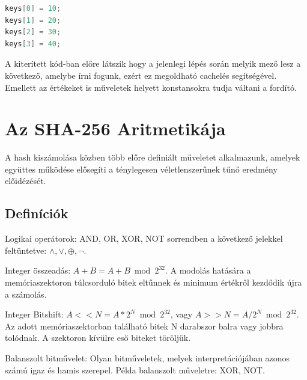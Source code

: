 \begin{lstlisting}[language={C++}]
keys[0] = 10;
keys[1] = 20;
keys[2] = 30;
keys[3] = 40;
\end{lstlisting}


A kiterített kód-ban előre látszik hogy a jelenlegi lépés során melyik mező lesz a következő, amelybe írni fogunk, ezért ez megoldható cachelés segítségével. Emellett az értékeket is műveletek helyett konstansokra tudja váltani a fordító.










\section{Az SHA-256 Aritmetikája}

A hash kiszámolása közben több előre definiált műveletet alkalmazunk, amelyek együttes működése elősegíti a ténylegesen véletlenszerűnek tűnő eredmény előidézését.



\subsection{Definíciók}


\begin{definition}
Logikai operátorok: AND, OR, XOR, NOT sorrendben a következő jelekkel feltüntetve: $\land, \lor, \oplus, \neg$.
\end{definition}

\begin{definition}
Integer összeadás: $A + B = A + B \bmod 2^{32} $. A modolás hatására a memóriaszektoron túlcsorduló bitek eltűnnek és minimum értékről kezdődik újra a számolás.
\end{definition}

\begin{definition}
Integer Bitshift: $A << N = A * 2^{N} \bmod 2^{32}$, vagy $A >> N = A / 2^{N} \bmod 2^{32}$. Az adott memóriaszektorban található bitek N darabszor balra vagy jobbra tolódnak. A szektoron kívülre eső biteket töröljük.
\end{definition}

\begin{definition}
Balanszolt bitművelet: Olyan bitműveletek, melyek interpretációjában azonos számú igaz és hamis szerepel. Példa balanszolt műveletre: XOR, NOT.
\end{definition}


